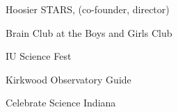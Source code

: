 
\begin{cventries}

  \cventry
    {} %
    {} %
    {} %
    {} %
    {
      \begin{cvitems} %
	\item{Hoosier STARS, (co-founder, director)}
        \item {Brain Club at the Boys and Girls Club}
	\item{IU Science Fest}
	\item{Kirkwood Observatory Guide}
	\item{Celebrate Science Indiana}
      \end{cvitems}
    }

\end{cventries}

	




